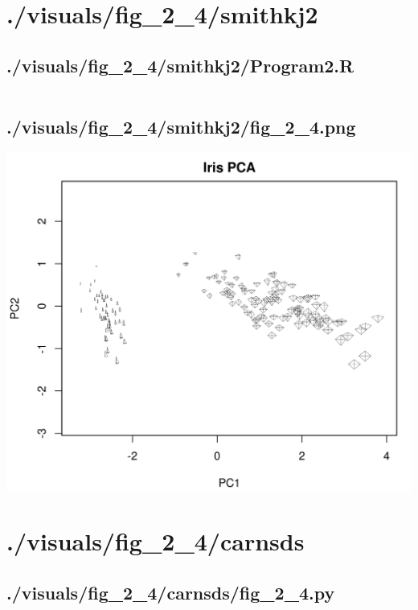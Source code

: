 \documentclass{report}
\begin{document}
    \section{./visuals/fig\_2\_4/smithkj2}
    \subsection{./visuals/fig\_2\_4/smithkj2/Program2.R}
    \inputminted[breaklines=true]{r}{.././visuals/fig_2_4/smithkj2/Program2.R}
    \subsection{./visuals/fig\_2\_4/smithkj2/fig\_2\_4.png}
    \includegraphics[width=\textwidth]{.././visuals/fig_2_4/smithkj2/fig_2_4.png}
    \pagebreak
    \section{./visuals/fig\_2\_4/carnsds}
    \subsection{./visuals/fig\_2\_4/carnsds/fig\_2\_4.py}
    \inputminted[breaklines=true]{python}{.././visuals/fig_2_4/carnsds/fig_2_4.py}
\end{document}
